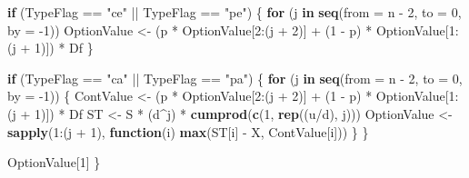 \documentclass[justified]{tufte-book}
\newenvironment{Shaded}{}{}
\newcommand{\ControlFlowTok}[1]{\textcolor[rgb]{0.00,0.44,0.13}{\textbf{#1}}}
\newcommand{\DataTypeTok}[1]{\textcolor[rgb]{0.56,0.13,0.00}{#1}}
\newcommand{\DecValTok}[1]{\textcolor[rgb]{0.25,0.63,0.44}{#1}}
\newcommand{\KeywordTok}[1]{\textcolor[rgb]{0.00,0.44,0.13}{\textbf{#1}}}
\newcommand{\NormalTok}[1]{#1}
\newcommand{\OperatorTok}[1]{\textcolor[rgb]{0.40,0.40,0.40}{#1}}
\newcommand{\StringTok}[1]{\textcolor[rgb]{0.25,0.44,0.63}{#1}}
\begin{document}
\begin{Shaded}
\begin{Highlighting}[]
    \ControlFlowTok{if}\NormalTok{ (TypeFlag }\OperatorTok{==}\StringTok{ "ce"} \OperatorTok{||}\StringTok{ }\NormalTok{TypeFlag }\OperatorTok{==}\StringTok{ "pe"}\NormalTok{) \{}
        \ControlFlowTok{for}\NormalTok{ (j }\ControlFlowTok{in} \KeywordTok{seq}\NormalTok{(}\DataTypeTok{from =}\NormalTok{ n }\OperatorTok{{-}}\StringTok{ }\DecValTok{2}\NormalTok{, }\DataTypeTok{to =} \DecValTok{0}\NormalTok{, }\DataTypeTok{by =} \DecValTok{{-}1}\NormalTok{)) OptionValue \textless{}{-}}\StringTok{ }\NormalTok{(p }\OperatorTok{*}
\StringTok{            }\NormalTok{OptionValue[}\DecValTok{2}\OperatorTok{:}\NormalTok{(j }\OperatorTok{+}\StringTok{ }\DecValTok{2}\NormalTok{)] }\OperatorTok{+}\StringTok{ }\NormalTok{(}\DecValTok{1} \OperatorTok{{-}}\StringTok{ }\NormalTok{p) }\OperatorTok{*}
\StringTok{            }\NormalTok{OptionValue[}\DecValTok{1}\OperatorTok{:}\NormalTok{(j }\OperatorTok{+}\StringTok{ }\DecValTok{1}\NormalTok{)]) }\OperatorTok{*}\StringTok{ }\NormalTok{Df}
\NormalTok{    \}}

    \ControlFlowTok{if}\NormalTok{ (TypeFlag }\OperatorTok{==}\StringTok{ "ca"} \OperatorTok{||}\StringTok{ }\NormalTok{TypeFlag }\OperatorTok{==}\StringTok{ "pa"}\NormalTok{) \{}
        \ControlFlowTok{for}\NormalTok{ (j }\ControlFlowTok{in} \KeywordTok{seq}\NormalTok{(}\DataTypeTok{from =}\NormalTok{ n }\OperatorTok{{-}}\StringTok{ }\DecValTok{2}\NormalTok{, }\DataTypeTok{to =} \DecValTok{0}\NormalTok{, }\DataTypeTok{by =} \DecValTok{{-}1}\NormalTok{)) \{}
\NormalTok{            ContValue \textless{}{-}}\StringTok{ }\NormalTok{(p }\OperatorTok{*}\StringTok{ }\NormalTok{OptionValue[}\DecValTok{2}\OperatorTok{:}\NormalTok{(j }\OperatorTok{+}
\StringTok{                }\DecValTok{2}\NormalTok{)] }\OperatorTok{+}\StringTok{ }\NormalTok{(}\DecValTok{1} \OperatorTok{{-}}\StringTok{ }\NormalTok{p) }\OperatorTok{*}\StringTok{ }\NormalTok{OptionValue[}\DecValTok{1}\OperatorTok{:}\NormalTok{(j }\OperatorTok{+}
\StringTok{                }\DecValTok{1}\NormalTok{)]) }\OperatorTok{*}\StringTok{ }\NormalTok{Df}
\NormalTok{            ST \textless{}{-}}\StringTok{ }\NormalTok{S }\OperatorTok{*}\StringTok{ }\NormalTok{(d}\OperatorTok{\^{}}\NormalTok{j) }\OperatorTok{*}\StringTok{ }\KeywordTok{cumprod}\NormalTok{(}\KeywordTok{c}\NormalTok{(}\DecValTok{1}\NormalTok{, }\KeywordTok{rep}\NormalTok{((u}\OperatorTok{/}\NormalTok{d),}
\NormalTok{                j)))}
\NormalTok{            OptionValue \textless{}{-}}\StringTok{ }\KeywordTok{sapply}\NormalTok{(}\DecValTok{1}\OperatorTok{:}\NormalTok{(j }\OperatorTok{+}\StringTok{ }\DecValTok{1}\NormalTok{), }\ControlFlowTok{function}\NormalTok{(i) }\KeywordTok{max}\NormalTok{(ST[i] }\OperatorTok{{-}}
\StringTok{                }\NormalTok{X, ContValue[i]))}
\NormalTok{        \}}
\NormalTok{    \}}

\NormalTok{    OptionValue[}\DecValTok{1}\NormalTok{]}
\NormalTok{\}}
\end{Highlighting}
\end{Shaded}
\end{document}
